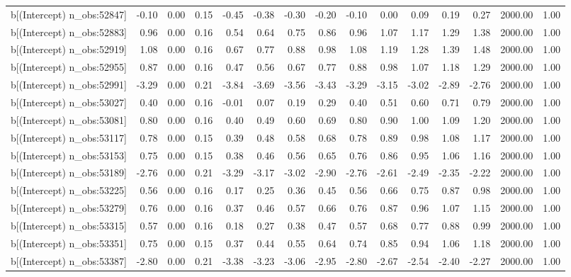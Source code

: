 \begin{table}[ht]
\begin{tabular}{rrrrrrrrrrrrrrr}
  b[(Intercept) n\_obs:52847] & -0.10 & 0.00 & 0.15 & -0.45 & -0.38 & -0.30 & -0.20 & -0.10 & 0.00 & 0.09 & 0.19 & 0.27 & 2000.00 & 1.00 \\ 
  b[(Intercept) n\_obs:52883] & 0.96 & 0.00 & 0.16 & 0.54 & 0.64 & 0.75 & 0.86 & 0.96 & 1.07 & 1.17 & 1.29 & 1.38 & 2000.00 & 1.00 \\ 
  b[(Intercept) n\_obs:52919] & 1.08 & 0.00 & 0.16 & 0.67 & 0.77 & 0.88 & 0.98 & 1.08 & 1.19 & 1.28 & 1.39 & 1.48 & 2000.00 & 1.00 \\ 
  b[(Intercept) n\_obs:52955] & 0.87 & 0.00 & 0.16 & 0.47 & 0.56 & 0.67 & 0.77 & 0.88 & 0.98 & 1.07 & 1.18 & 1.29 & 2000.00 & 1.00 \\ 
  b[(Intercept) n\_obs:52991] & -3.29 & 0.00 & 0.21 & -3.84 & -3.69 & -3.56 & -3.43 & -3.29 & -3.15 & -3.02 & -2.89 & -2.76 & 2000.00 & 1.00 \\ 
  b[(Intercept) n\_obs:53027] & 0.40 & 0.00 & 0.16 & -0.01 & 0.07 & 0.19 & 0.29 & 0.40 & 0.51 & 0.60 & 0.71 & 0.79 & 2000.00 & 1.00 \\ 
  b[(Intercept) n\_obs:53081] & 0.80 & 0.00 & 0.16 & 0.40 & 0.49 & 0.60 & 0.69 & 0.80 & 0.90 & 1.00 & 1.09 & 1.20 & 2000.00 & 1.00 \\ 
  b[(Intercept) n\_obs:53117] & 0.78 & 0.00 & 0.15 & 0.39 & 0.48 & 0.58 & 0.68 & 0.78 & 0.89 & 0.98 & 1.08 & 1.17 & 2000.00 & 1.00 \\ 
  b[(Intercept) n\_obs:53153] & 0.75 & 0.00 & 0.15 & 0.38 & 0.46 & 0.56 & 0.65 & 0.76 & 0.86 & 0.95 & 1.06 & 1.16 & 2000.00 & 1.00 \\ 
  b[(Intercept) n\_obs:53189] & -2.76 & 0.00 & 0.21 & -3.29 & -3.17 & -3.02 & -2.90 & -2.76 & -2.61 & -2.49 & -2.35 & -2.22 & 2000.00 & 1.00 \\ 
  b[(Intercept) n\_obs:53225] & 0.56 & 0.00 & 0.16 & 0.17 & 0.25 & 0.36 & 0.45 & 0.56 & 0.66 & 0.75 & 0.87 & 0.98 & 2000.00 & 1.00 \\ 
  b[(Intercept) n\_obs:53279] & 0.76 & 0.00 & 0.16 & 0.37 & 0.46 & 0.57 & 0.66 & 0.76 & 0.87 & 0.96 & 1.07 & 1.15 & 2000.00 & 1.00 \\ 
  b[(Intercept) n\_obs:53315] & 0.57 & 0.00 & 0.16 & 0.18 & 0.27 & 0.38 & 0.47 & 0.57 & 0.68 & 0.77 & 0.88 & 0.99 & 2000.00 & 1.00 \\ 
  b[(Intercept) n\_obs:53351] & 0.75 & 0.00 & 0.15 & 0.37 & 0.44 & 0.55 & 0.64 & 0.74 & 0.85 & 0.94 & 1.06 & 1.18 & 2000.00 & 1.00 \\ 
  b[(Intercept) n\_obs:53387] & -2.80 & 0.00 & 0.21 & -3.38 & -3.23 & -3.06 & -2.95 & -2.80 & -2.67 & -2.54 & -2.40 & -2.27 & 2000.00 & 1.00 \\ 

\end{tabular}
\end{table}
